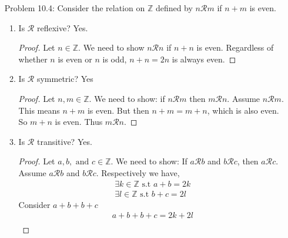 \documentclass{article}
\theoremstyle{claim}
\theoremstyle{definition}
\begin{document}
\begin{enumerate}
\begin{enumerate}
\begin{proof}
\begin{enumerate}
                    \item[2.] $E_r \subseteq E_s$.
                        Assume $q \in E_r$. Then exactly one of these has to be true: $q = 1, q = \frac{1}{2}, \text{ or } q = r$. But $r = s$. So then exactly one of these holds: $q = 1, q = \frac{1}{2}, \text{ or } q = s$. This means $q \in E_s$.
                \end{enumerate}
                Thus: If $E_s = E_r$, then $s = r$.
            \end{proof}
    \end{enumerate}
    \item[Problem 10.4:] Consider the relation on $\mathbb{Z}$ defined by $n \mathcal{R} m$ if $n + m$ is even.
        \begin{enumerate}
            \item Is $\mathcal{R}$ reflexive? Yes.
                \begin{proof}
                    Let $n \in \mathbb{Z}$. We need to show $n \mathcal{R} n$ if $n + n$ is even. Regardless of whether $n$ is even or $n$ is odd, $n + n = 2n$ is always even.
                \end{proof}
            \item Is $\mathcal{R}$ symmetric? Yes
                \begin{proof}
                    Let $n, m \in \mathbb{Z}$. We need to show: if $n \mathcal{R} m$ then $m \mathcal{R} n$. Assume $n \mathcal{R} m$. This means $n + m$ is even. But then $n + m = m + n$, which is also even. So $m + n$ is even. Thus $m \mathcal{R} n$.
                \end{proof}
            \item Is $\mathcal{R}$ transitive? Yes.
                \begin{proof}
                Let $a, b, \text{ and } c \in \mathbb{Z}$. We need to show: If $a \mathcal{R} b$ and $b \mathcal{R} c$, then $a \mathcal{R} c$.\\
                Assume $a \mathcal{R} b$ and $b \mathcal{R} c$. Respectively we have,
                \begin{gather*}
                    \exists k \in \mathbb{Z} \text{ s.t } a + b = 2k\\
                    \exists l \in \mathbb{Z} \text{ s.t } b + c = 2l
                \end{gather*}
                Consider $a + b + b + c$
                \begin{gather*}
                    a + b + b + c = 2k + 2l\\

\end{gather*}
\end{proof}
\end{enumerate}
\end{enumerate}
\end{document}
